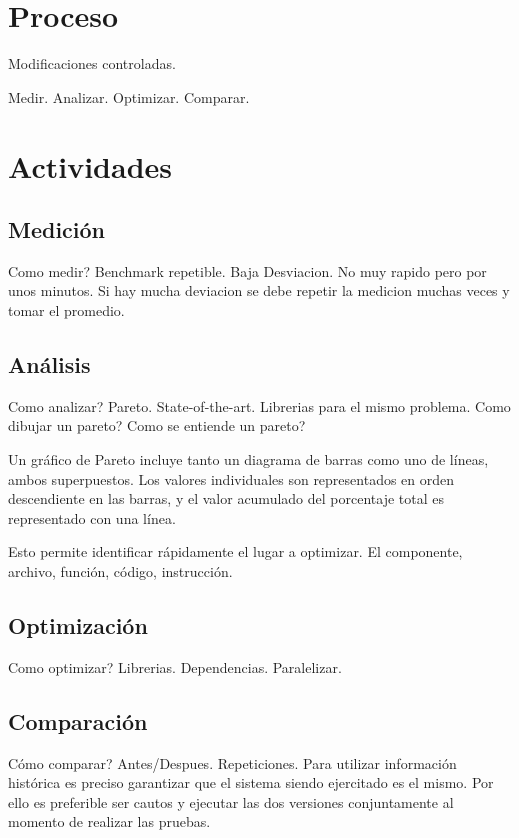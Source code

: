 \documentclass[a4paper]{report}
\begin{document}
\section{Proceso}

Modificaciones controladas.

\bigskip

Medir. Analizar. Optimizar. Comparar.

\section{Actividades}

\subsection{Medici\'on}

Como medir? Benchmark repetible. Baja Desviacion. No muy rapido pero por unos
minutos. Si hay mucha deviacion se debe repetir la medicion muchas veces y
tomar el promedio.

\subsection{An\'alisis}

Como analizar? Pareto. State-of-the-art. Librerias para el mismo problema.
Como dibujar un pareto? Como se entiende un pareto?

Un gr\'afico de Pareto incluye tanto un diagrama de barras como uno de l\'ineas, ambos superpuestos.
Los valores individuales son representados en orden descendiente en las barras, y el valor acumulado del porcentaje total es representado con una l\'inea.

Esto permite identificar r\'apidamente el lugar a optimizar. El componente, archivo, funci\'on, c\'odigo, instrucci\'on.

\subsection{Optimizaci\'on}

Como optimizar? Librerias. Dependencias. Paralelizar.

\subsection{Comparaci\'on}

C\'omo comparar? Antes/Despues. Repeticiones. Para utilizar informaci\'on
hist\'orica es preciso garantizar que el sistema siendo ejercitado es el mismo. Por ello es preferible ser cautos y ejecutar las dos versiones conjuntamente
al momento de realizar las pruebas. 
\end{document}
